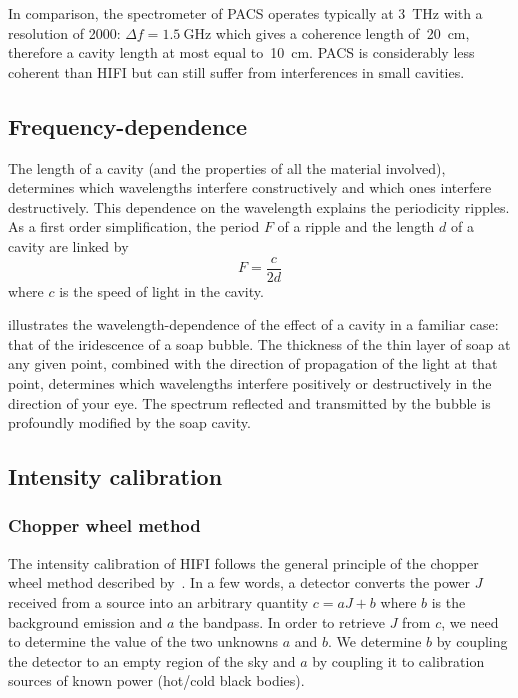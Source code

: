 In comparison, the spectrometer of PACS operates typically at \SI{3}{\tera\hertz} with a resolution of 2000: $\Delta f = \SI{1.5}{\giga\hertz}$ which gives a coherence length of~\SI{20}{\centi\meter}, therefore a cavity length at most equal to~\SI{10}{\centi\meter}.
PACS is considerably less coherent than HIFI but can still suffer from interferences in small cavities.

\subsection{Frequency-dependence}

The length of a cavity (and the properties of all the material involved), determines which wavelengths interfere constructively and which ones interfere destructively.
This dependence on the wavelength explains the periodicity ripples.
As a first order simplification, the period $F$ of a ripple and the length $d$ of a cavity are linked by
\begin{equation}
    F = \frac{c}{2d}
\end{equation}
where $c$ is the speed of light in the cavity.

 illustrates the wavelength-dependence of the effect of a cavity in a familiar case: that of the iridescence of a soap bubble.
The thickness of the thin layer of soap at any given point, combined with the direction of propagation of the light at that point, determines which wavelengths interfere positively or destructively in the direction of your eye.
The spectrum reflected and transmitted by the bubble is profoundly modified by the soap cavity.





\subsection{Intensity calibration}
\label{sec:intensity_calibration}

\subsubsection{Chopper wheel method}
The intensity calibration of HIFI follows the general principle of the chopper wheel method described by~\textcite{ulich1976absolute,kutner1981recommendations}.
In a few words, a detector converts the power $J$ received from a source into an arbitrary quantity $c=aJ+b$ where $b$ is the background emission and $a$ the bandpass.
In order to retrieve $J$ from $c$, we need to determine the value of the two unknowns $a$ and $b$.
We determine $b$ by coupling the detector to an empty region of the sky and $a$ by coupling it to calibration sources of known power (hot/cold black bodies).

